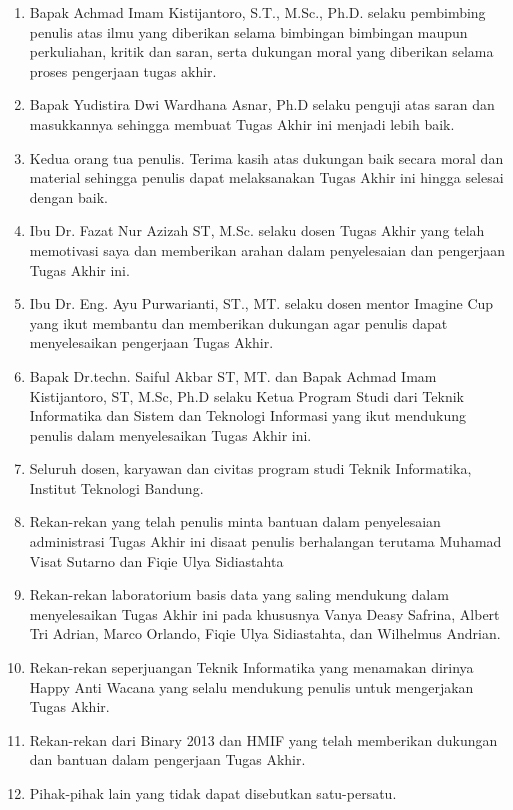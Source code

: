 \begin{enumerate}
    \item Bapak Achmad Imam Kistijantoro, S.T., M.Sc., Ph.D. selaku pembimbing penulis atas ilmu yang diberikan selama bimbingan bimbingan maupun perkuliahan, kritik dan saran, serta dukungan moral yang diberikan selama proses pengerjaan tugas akhir.

    \item Bapak Yudistira Dwi Wardhana Asnar, Ph.D selaku penguji atas saran dan masukkannya sehingga membuat Tugas Akhir ini menjadi lebih baik.

    \item Kedua orang tua penulis. Terima kasih atas dukungan baik secara moral dan material sehingga penulis dapat melaksanakan Tugas Akhir ini hingga selesai dengan baik.
    
    \item Ibu Dr. Fazat Nur Azizah ST, M.Sc. selaku dosen Tugas Akhir yang telah memotivasi saya dan memberikan arahan dalam penyelesaian dan pengerjaan Tugas Akhir ini.
    
    \item Ibu Dr. Eng. Ayu Purwarianti, ST., MT. selaku dosen mentor Imagine Cup yang ikut membantu dan memberikan dukungan agar penulis dapat menyelesaikan pengerjaan Tugas Akhir.
    
	\item Bapak Dr.techn. Saiful Akbar ST, MT. dan Bapak Achmad Imam Kistijantoro, ST, M.Sc, Ph.D selaku Ketua Program Studi dari Teknik Informatika dan Sistem dan Teknologi Informasi yang ikut mendukung penulis dalam menyelesaikan Tugas Akhir ini.
    
    \item Seluruh dosen, karyawan dan civitas program studi Teknik Informatika, Institut Teknologi Bandung.
    
    \item Rekan-rekan yang telah penulis minta bantuan dalam penyelesaian administrasi Tugas Akhir ini disaat penulis berhalangan terutama Muhamad Visat Sutarno dan Fiqie Ulya Sidiastahta
    
    \item Rekan-rekan laboratorium basis data yang saling mendukung dalam menyelesaikan Tugas Akhir ini pada khususnya Vanya Deasy Safrina, Albert Tri Adrian, Marco Orlando, Fiqie Ulya Sidiastahta, dan Wilhelmus Andrian.
    
    \item Rekan-rekan seperjuangan Teknik Informatika yang menamakan dirinya Happy Anti Wacana yang selalu mendukung penulis untuk mengerjakan Tugas Akhir.
    
    \item Rekan-rekan dari Binary 2013 dan HMIF yang telah memberikan dukungan dan bantuan dalam pengerjaan Tugas Akhir.
    
    \item Pihak-pihak lain yang tidak dapat disebutkan satu-persatu.
\end{enumerate}

